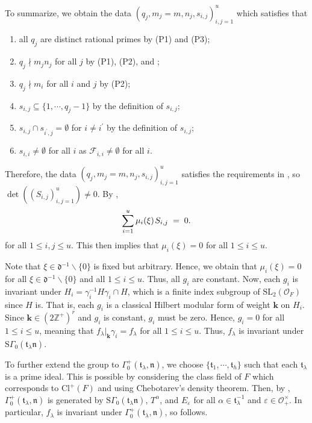 \documentclass[11pt]{amsart}
\theoremstyle{remark}
\newcommand\mbf[1]{\mathbf{#1}}
\newcommand\cl[1]{\mathcal{#1}}
\newcommand\fr[1]{\mathfrak{#1}}
\newcommand{\inte}{\mathbb{Z}}
\newcommand{\eps}{\varepsilon}
\newcommand{\clo}{\mathcal{O}}
\newcommand{\bslash}{\backslash}
\newcommand{\eq}{\;=\;}
\def\thin{{\hskip 1pt}}
\newcommand{\SL}{\mathrm{SL}}
\newcommand{\Cl}{\mathrm{Cl}}
\newcommand{\SG}{\mathrm{S}\Gamma}
\begin{document}
To summarize, we obtain the data $(q_j,m_j=m,n_j,s_{i,j})_{i,j=1}^u$ which satisfies that
\begin{enumerate}[label=\rm{(\arabic*)}]
    \item all $q_j$ are distinct rational primes by (P1) and (P3);
    \item $q_j\nmid m_jn_j$ for all $j$ by (P1), (P2), and ;
    \item $q_j\nmid m_i$ for all $i$ and $j$ by (P2);
    \item $s_{i,j}\subseteq\{1,\cdots,q_j-1\}$ by the definition of $s_{i,j}$;
    \item $s_{i,j}\cap s_{i^\prime,j}=\emptyset$ for $i\neq i^\prime$ by the definition of $s_{i,j}$;
    \item $s_{i,i}\neq\emptyset$ for all $i$ as $\cl{F}_{i,i}\neq\emptyset$ for all $i$.
\end{enumerate}
Therefore, the data $(q_j,m_j=m,n_j,s_{i,j})_{i,j=1}^u$ satisfies the requirements in , so \mbox{$\det((S_{i,j})_{i,j=1}^u)\neq 0$}. By ,
\begin{align*}
    \sum_{i=1}^u\mu_i(\xi)\thin S_{i,j}\eq 0.
\end{align*}
for all $1\leq i,j\leq u$. This then implies that $\mu_i(\xi)=0$ for all $1\leq i\leq u$.

Note that $\xi\in\fr{d}^{-1}\bslash\{0\}$ is fixed but arbitrary. Hence, we obtain that $\mu_i(\xi)=0$ for all $\xi\in\fr{d}^{-1}\bslash\{0\}$ and all $1\leq i\leq u$. Thus, all $g_i$ are constant. Now, each $g_i$ is invariant under $H_i=\gamma_i^{-1}H\gamma_i\cap H$, which is a finite index subgroup of $\SL_2(\clo_F)$ since $H$ is. That is, each $g_i$ is a classical Hilbert modular form of weight $\mbf{k}$ on $H_i$. Since $\mbf{k}\in(2\inte^+)^r$ and $g_i$ is constant, $g_i$ must be zero. Hence, $g_i=0$ for all $1\leq i\leq u$, meaning that $f_\lambda|_\mbf{k}\gamma_i=f_\lambda$ for all $1\leq i\leq u$. Thus, $f_\lambda$ is invariant under $\SG_0(\fr{t}_\lambda\fr{n})$. 

To further extend the group to $\Gamma_0^+(\fr{t}_\lambda,\fr{n})$, we choose $\{\fr{t}_1,\cdots,\fr{t}_h\}$ such that each $\fr{t}_\lambda$ is a prime ideal. This is possible by considering the class field of $F$ which corresponds to $\Cl^+(F)$ and using Chebotarev's density theorem. Then, by , $\Gamma_0^+(\fr{t}_\lambda,\fr{n})$ is generated by $\SG_0(\fr{t}_\lambda\fr{n})$, $T^\alpha$, and $E_\eps$ for all $\alpha\in\fr{t}_\lambda^{-1}$ and $\eps\in\clo_+^\times$. In particular, $f_\lambda$ is invariant under $\Gamma_0^+(\fr{t}_\lambda,\fr{n})$, so  follows.
\end{document}
